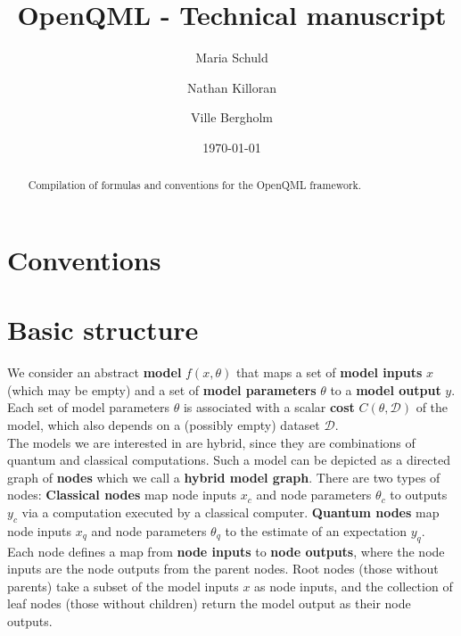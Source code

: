 \documentclass[aps,pra,10pt,twocolumn,groupedaddress,nofootinbib]{revtex4-1}
\theoremstyle{plain}
\begin{document}
\title{OpenQML - Technical manuscript}
\author{Maria Schuld}
\author{Nathan Killoran}
\author{Ville Bergholm}


\date{\today}

\begin{abstract}
Compilation of formulas and conventions for the OpenQML framework.
\end{abstract}

\maketitle


\section{Conventions}
\section{Basic structure}

We consider an abstract \textbf{model} $f(x, \theta)$ 
that maps a set of \textbf{model inputs} $x$ (which may be empty) and a set of \textbf{model parameters} $\theta$ to a \textbf{model output} $y$. \\

Each set of model parameters $\theta$ is associated with a scalar \textbf{cost} $C(\theta, \mathcal{D})$ of the model, which also depends on a (possibly empty) dataset $\mathcal{D}$.\\

The models we are interested in are hybrid, since they are combinations of quantum and classical computations. Such a model can be depicted as a directed graph of \textbf{nodes} which we call a \textbf{hybrid model graph}. There are two types of nodes: \textbf{Classical nodes} map node inputs $x_c$ and node parameters $\theta_c$ to outputs $y_c$ via a computation executed by a classical computer. \textbf{Quantum nodes} map node inputs $x_q$ and node parameters $\theta_q$ to the estimate of an expectation $y_q$.\\

Each node defines a map from \textbf{node inputs} to \textbf{node outputs}, where the node inputs are the node outputs from the parent nodes. Root nodes (those without parents) take a subset of the model inputs $x$ as node inputs, and the collection of leaf nodes (those without children) return the model output as their node outputs. 
\end{document}
